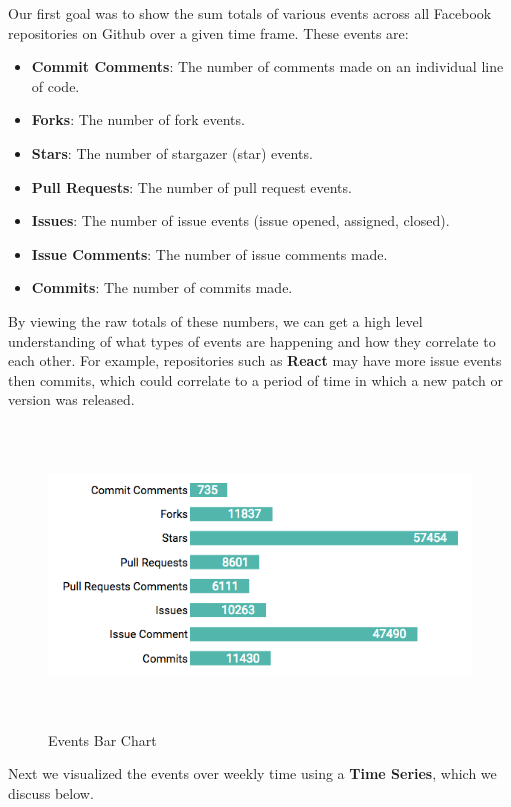 \documentclass{article}
\begin{document}
Our first goal was to show the sum totals of various events across all Facebook repositories on Github over a given time frame. These events are:

\begin {itemize}
	\item \textbf{Commit Comments}: The number of comments made on an individual line of code.
	\item \textbf{Forks}: The number of fork events.
	\item \textbf{Stars}: The number of stargazer (star) events.
	\item \textbf{Pull Requests}: The number of pull request events.
	\item \textbf{Issues}: The number of issue events (issue opened, assigned, closed).
	\item \textbf{Issue Comments}: The number of issue comments made.
	\item \textbf{Commits}: The number of commits made.
\end {itemize}

By viewing the raw totals of these numbers, we can get a high level understanding of what types of events are happening and how they correlate to each other. 
For example, repositories such as \textbf{React} may have more issue events then commits, which could correlate to a period of time in which a new patch or version was released.

\begin{figure}[h!]
\centering
\includegraphics[height=8cm, width=16cm]{bar}
\caption{Events Bar Chart}
\end{figure}

Next we visualized the events over weekly time using a \textbf{Time Series}, which we discuss below.
\end{document}
